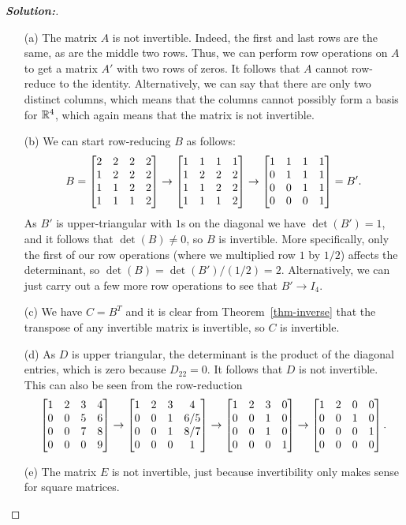 \documentclass[a4paper]{amsart}
\theoremstyle{definition}
\newenvironment{solution}{\begin{proof}[\textbf{Solution:}] \vphantom{u}}{\end{proof}}
\begin{document}
\begin{solution}
 \begin{itemize}
  \item[(a)] The matrix $A$ is not invertible.  Indeed, the first and
   last rows are the same, as are the middle two rows.  Thus, we can
   perform row operations on $A$ to get a matrix $A'$ with two rows of
   zeros.  It follows that $A$ cannot row-reduce to the identity.
   Alternatively, we can say that there are only two distinct columns,
   which means that the columns cannot possibly form a basis for
   ${\mathbb{R}}^4$, which again means that the matrix is not invertible.
  \item[(b)] We can start row-reducing $B$ as follows:
   \[ B = 
       \left[\begin{matrix} 2&2&2&2 \\ 1&2&2&2 \\ 1&1&2&2 \\ 1&1&1&2 \end{matrix}\right] \to
       \left[\begin{matrix} 1&1&1&1 \\ 1&2&2&2 \\ 1&1&2&2 \\ 1&1&1&2 \end{matrix}\right] \to
       \left[\begin{matrix} 1&1&1&1 \\ 0&1&1&1 \\ 0&0&1&1 \\ 0&0&0&1 \end{matrix}\right] = B'.
   \]
   As $B'$ is upper-triangular with $1$s on the diagonal we have
   $\det(B')=1$, and it follows that $\det(B)\neq 0$, so $B$ is
   invertible.  More specifically, only the first of our row
   operations (where we multiplied row $1$ by $1/2$) affects the
   determinant, so $\det(B)=\det(B')/(1/2)=2$.  Alternatively, we can
   just carry out a few more row operations to see that $B'\to I_4$.
  \item[(c)] We have $C=B^T$ and it is clear from
   Theorem~\ref{thm-inverse} that the transpose of any invertible
   matrix is invertible, so $C$ is invertible.
  \item[(d)] As $D$ is upper triangular, the determinant is the
   product of the diagonal entries, which is zero because $D_{22}=0$.
   It follows that $D$ is not invertible.  This can also be seen from
   the row-reduction
   \[ 
      \left[\begin{matrix} 1&2&3&4 \\ 0&0&5&6 \\ 0&0&7&8 \\ 0&0&0&9 \end{matrix}\right] \to
      \left[\begin{matrix} 1&2&3&4 \\ 0&0&1&6/5 \\ 0&0&1&8/7 \\ 0&0&0&1 \end{matrix}\right] \to
      \left[\begin{matrix} 1&2&3&0 \\ 0&0&1&0 \\ 0&0&1&0 \\ 0&0&0&1 \end{matrix}\right] \to
      \left[\begin{matrix} 1&2&0&0 \\ 0&0&1&0 \\ 0&0&0&1 \\ 0&0&0&0 \end{matrix}\right].
   \]
  \item[(e)] The matrix $E$ is not invertible, just because
   invertibility only makes sense for square matrices.
 \end{itemize}
\end{solution}
\end{document}
